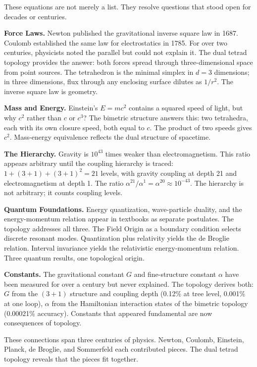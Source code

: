 \documentclass[aps,prd,preprint,superscriptaddress,showpacs,preprintnumbers,amsmath,amssymb,nofootinbib]{revtex4-2}
\begin{document}
These equations are not merely a list. They resolve questions that stood open for decades or centuries.

\textbf{Force Laws.} Newton published the gravitational inverse square law in 1687. Coulomb established the same law for electrostatics in 1785. For over two centuries, physicists noted the parallel but could not explain it. The dual tetrad topology provides the answer: both forces spread through three-dimensional space from point sources. The tetrahedron is the minimal simplex in $d = 3$ dimensions; in three dimensions, flux through any enclosing surface dilutes as $1/r^2$. The inverse square law is geometry.

\textbf{Mass and Energy.} Einstein's $E = mc^2$ contains a squared speed of light, but why $c^2$ rather than $c$ or $c^3$? The bimetric structure answers this: two tetrahedra, each with its own closure speed, both equal to $c$. The product of two speeds gives $c^2$. Mass-energy equivalence reflects the dual structure of spacetime.

\textbf{The Hierarchy.} Gravity is $10^{43}$ times weaker than electromagnetism. This ratio appears arbitrary until the coupling hierarchy is traced: $1 + (3+1) + (3+1)^2 = 21$ levels, with gravity coupling at depth 21 and electromagnetism at depth 1. The ratio $\alpha^{21}/\alpha^{1} = \alpha^{20} \approx 10^{-43}$. The hierarchy is not arbitrary; it counts coupling levels.

\textbf{Quantum Foundations.} Energy quantization, wave-particle duality, and the energy-momentum relation appear in textbooks as separate postulates. The topology addresses all three. The Field Origin as a boundary condition selects discrete resonant modes. Quantization plus relativity yields the de Broglie relation. Interval invariance yields the relativistic energy-momentum relation. Three quantum results, one topological origin.

\textbf{Constants.} The gravitational constant $G$ and fine-structure constant $\alpha$ have been measured for over a century but never explained. The topology derives both: $G$ from the $(3+1)$ structure and coupling depth (0.12\% at tree level, 0.001\% at one loop), $\alpha$ from the Hamiltonian interaction states of the bimetric topology (0.00021\% accuracy). Constants that appeared fundamental are now consequences of topology.

These connections span three centuries of physics. Newton, Coulomb, Einstein, Planck, de Broglie, and Sommerfeld each contributed pieces. The dual tetrad topology reveals that the pieces fit together.
\end{document}
